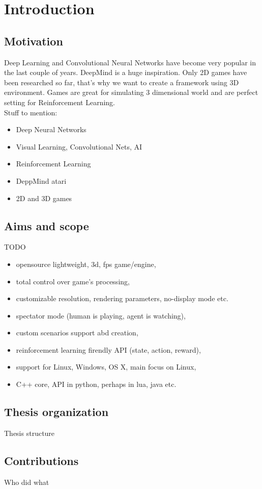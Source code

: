 
\chapter{Introduction}

\section{Motivation}
Deep Learning and Convolutional Neural Networks have become very popular in the last couple of years. DeepMind is a huge inspiration. Only 2D games have been researched so far, that's why we want to create a framework using 3D environment. Games are great for simulating 3 dimensional world and are perfect setting for Reinforcement Learning.\\
Stuff to mention:
\begin{itemize}
	\item Deep Neural Networks
	\item Visual Learning, Convolutional Nets, AI
	\item Reinforcement Learning
	\item DeppMind atari
	\item 2D and 3D games
\end{itemize}

\section{Aims and scope}
TODO
\begin{itemize}
	\item opensource lightweight, 3d, fps game/engine,
	\item total control over game's processing,
	\item customizable resolution, rendering parameters, no-display mode etc.
	\item spectator mode (human is playing, agent is watching),
	\item custom scenarios support abd creation,
	\item reinforcement learning firendly API (state, action, reward),
	\item support for Linux, Windows, OS X, main focus on Linux,
	\item C++ core, API in python, perhaps in lua, java etc.
\end{itemize}
	
\section{Thesis organization}
Thesis structure

\section{Contributions}
Who did what
